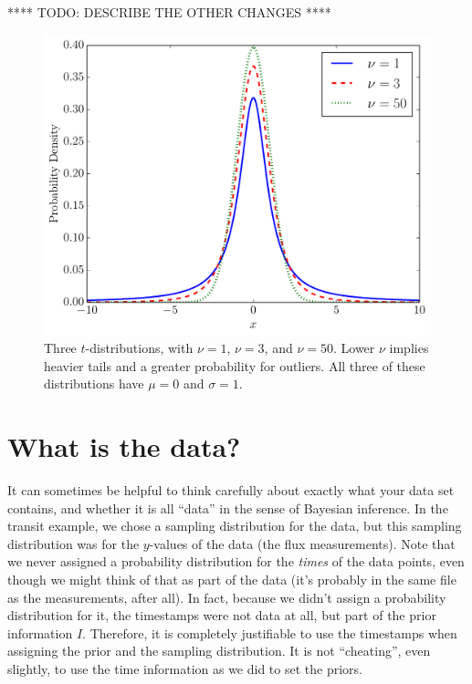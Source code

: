 **** TODO: DESCRIBE THE OTHER CHANGES ****


\begin{figure}
\begin{center}
\includegraphics[scale=0.5]{tdist.pdf}
\caption{Three $t$-distributions, with $\nu=1$, $\nu=3$, and $\nu=50$. Lower
$\nu$ implies heavier tails and a greater probability for outliers. All three
of these distributions have $\mu=0$ and $\sigma=1$.
\label{fig:tdist}}
\end{center}
\end{figure}

\section{What is the data?}
It can sometimes be helpful to think carefully about exactly what your data set
contains, and whether it is all ``data'' in the sense of Bayesian inference.
In the transit example, we chose a sampling distribution for the data, but this
sampling distribution was for the $y$-values of the data
(the flux measurements). Note that we never assigned a probability distribution
for the {\it times} of the data points, even though we might think of that as
part of the data (it's probably in the same file as the measurements, after all).
In fact, because we didn't assign a probability distribution for it, the
timestamps were not data at all, but part of the prior information $I$.
Therefore, it is completely justifiable to use the timestamps when assigning
the prior and the sampling distribution. It is not ``cheating'', even slightly,
to use the time information as we did to set the priors.

